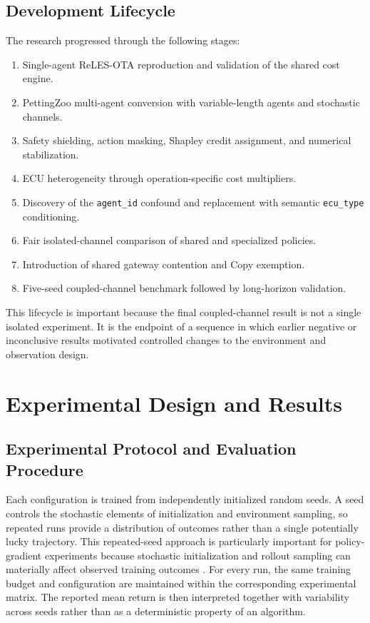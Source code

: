 \documentclass{iutbscthesis}
\begin{document}
\section{Development Lifecycle}
The research progressed through the following stages:
\begin{enumerate}[leftmargin=*]
    \item Single-agent ReLES-OTA reproduction and validation of the shared cost engine.
    \item PettingZoo multi-agent conversion with variable-length agents and stochastic channels.
    \item Safety shielding, action masking, Shapley credit assignment, and numerical stabilization.
    \item ECU heterogeneity through operation-specific cost multipliers.
    \item Discovery of the \texttt{agent\_id} confound and replacement with semantic \texttt{ecu\_type} conditioning.
    \item Fair isolated-channel comparison of shared and specialized policies.
    \item Introduction of shared gateway contention and Copy exemption.
    \item Five-seed coupled-channel benchmark followed by long-horizon validation.
\end{enumerate}

This lifecycle is important because the final coupled-channel result is not a single isolated experiment. It is the endpoint of a sequence in which earlier negative or inconclusive results motivated controlled changes to the environment and observation design.

\chapter{Experimental Design and Results}


\section{Experimental Protocol and Evaluation Procedure}
Each configuration is trained from independently initialized random seeds. A seed controls the stochastic elements of initialization and environment sampling, so repeated runs provide a distribution of outcomes rather than a single potentially lucky trajectory. This repeated-seed approach is particularly important for policy-gradient experiments because stochastic initialization and rollout sampling can materially affect observed training outcomes \parencite{schulman2017ppo,raffin2021sb3}. For every run, the same training budget and configuration are maintained within the corresponding experimental matrix. The reported mean return is then interpreted together with variability across seeds rather than as a deterministic property of an algorithm.
\end{document}
